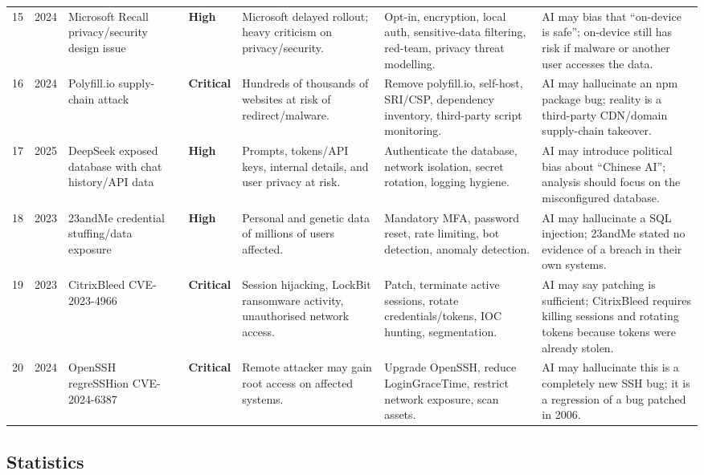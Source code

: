 \documentclass[12pt, a4paper]{article}
\newcommand{\scrit}{\textcolor{CritSev}{\textbf{Critical}}}
\newcommand{\shigh}{\textcolor{HighSev}{\textbf{High}}}
\begin{document}
{\begin{longtable}{@{} C{0.6cm} C{0.7cm} L{2.8cm} L{2.6cm} L{2.4cm} L{2.4cm} L{2.5cm} @{}}
15 & 2024 & Microsoft Recall privacy/security design issue & \shigh & Microsoft delayed rollout; heavy criticism on privacy/security. & Opt-in, encryption, local auth, sensitive-data filtering, red-team, privacy threat modelling. & AI may bias that ``on-device is safe''; on-device still has risk if malware or another user accesses the data. \\
16 & 2024 & Polyfill.io supply-chain attack & \scrit & Hundreds of thousands of websites at risk of redirect/malware. & Remove polyfill.io, self-host, SRI/CSP, dependency inventory, third-party script monitoring. & AI may hallucinate an npm package bug; reality is a third-party CDN/domain supply-chain takeover. \\
17 & 2025 & DeepSeek exposed database with chat history/API data & \shigh & Prompts, tokens/API keys, internal details, and user privacy at risk. & Authenticate the database, network isolation, secret rotation, logging hygiene. & AI may introduce political bias about ``Chinese AI''; analysis should focus on the misconfigured database. \\
18 & 2023 & 23andMe credential stuffing/data exposure & \shigh & Personal and genetic data of millions of users affected. & Mandatory MFA, password reset, rate limiting, bot detection, anomaly detection. & AI may hallucinate a SQL injection; 23andMe stated no evidence of a breach in their own systems. \\
19 & 2023 & CitrixBleed CVE-2023-4966 & \scrit & Session hijacking, LockBit ransomware activity, unauthorised network access. & Patch, terminate active sessions, rotate credentials/tokens, IOC hunting, segmentation. & AI may say patching is sufficient; CitrixBleed requires killing sessions and rotating tokens because tokens were already stolen. \\
20 & 2024 & OpenSSH regreSSHion CVE-2024-6387 & \scrit & Remote attacker may gain root access on affected systems. & Upgrade OpenSSH, reduce LoginGraceTime, restrict network exposure, scan assets. & AI may hallucinate this is a completely new SSH bug; it is a regression of a bug patched in 2006. \\
\bottomrule
\end{longtable}
}

\subsection{Statistics}
\end{document}
